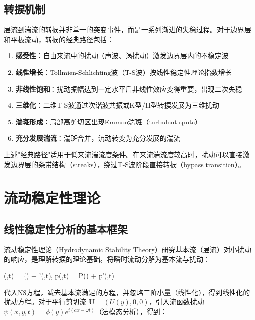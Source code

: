\subsection{转捩机制}

层流到湍流的转捩并非单一的突变事件，而是一系列渐进的失稳过程。对于边界层和平板流动，转捩的经典路径包括：

\begin{enumerate}
    \item \textbf{感受性}：自由来流中的扰动（声波、涡扰动）激发边界层内的不稳定波
    \item \textbf{线性增长}：Tollmien-Schlichting波（T-S波）按线性稳定性理论指数增长
    \item \textbf{非线性饱和}：扰动振幅达到一定水平后非线性效应变得重要，出现二次失稳
    \item \textbf{三维化}：二维T-S波通过次谐波共振或K型/H型转捩发展为三维扰动
    \item \textbf{湍斑形成}：局部高剪切区出现Emmon湍斑（turbulent spots）
    \item \textbf{充分发展湍流}：湍斑合并，流动转变为充分发展的湍流
\end{enumerate}

\begin{remark}
上述"经典路径"适用于低来流湍流度条件。在来流湍流度较高时，扰动可以直接激发边界层的条带结构（streaks），绕过T-S波阶段直接转捩（bypass transition）。
\end{remark}

\section{流动稳定性理论}

\subsection{线性稳定性分析的基本框架}

流动稳定性理论（Hydrodynamic Stability Theory）研究基本流（层流）对小扰动的响应，是理解转捩的理论基础。将瞬时流动分解为基本流与扰动：

\begin{myformula}
    (,t) = () + '(,t),\quad
    p(,t) = P() + p'(,t)
\end{myformula}

代入NS方程，减去基本流满足的方程，并忽略二阶小量（线性化），得到线性化的扰动方程。对于平行剪切流 $\mathbf{U} = (U(y),0,0)$，引入流函数扰动 $\psi(x,y,t) = \phi(y)e^{i(\alpha x - \omega t)}$（法模态分析），得到：

